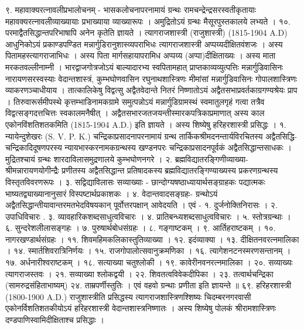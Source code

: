 ९. महावाक्यरत्नावलीप्रभालोचनम् -
भासकलोचनापरनामायं ग्रन्थः रामचन्द्रेन्द्रसरस्वतीकृतायाः महावक्यरत्नावलीव्याख्यायाः प्रभाख्याया व्याख्यारूपः । अमुद्रितोऽयं ग्रन्थः मैसूरपुस्तकालये लभ्यते ।
१०. परमाद्वैतसिद्धान्तपरिभाषापि अनेन कृतेति ज्ञायते ।
त्यागराजशास्त्री (राजुशास्त्री) (1815-1904 A.D)
आधुनिकोऽयं प्रकाण्डपण्डित मन्नार्गुडिरानुशास्व्यपराभिधः त्यागराजशास्त्री अप्पय्यदीक्षितवंशजः । अस्य पितामहस्त्यागराजाभिधः । अस्य पिता मार्गसहायापरामिध अप्पय्य (अप्पा)दीक्षिताख्यः । अस्य माता मरकतवल्लीनाम्नी । भारद्वाजगोत्रजोऽयं बाल्यादारभ्य स्वपितामहात् प्राप्तकाव्यव्युत्पत्तिः मन्नार्गुडिवासिनः नारायणसरस्वस्याः वेदान्तशास्त्रं, कुम्भघोणवासिन रघुनाथशास्त्रिणः मीमांसां मन्नार्गुडिवासिनः गोपालशास्त्रिणः व्याकरणञ्चाधीयाय । तात्कालिकेषु विद्वत्सु अद्वैतवेदान्ते नितरं निष्णातोऽयं अद्वैतसभाप्रवर्तकाग्रगण्यश्रेयः प्राप । तिरुवारूर्समीपस्थे कृत्तम्भाडिनामकग्रामे समुत्पन्नोऽयं मन्नार्गुडिग्रामस्थं स्वमातुलगृहं गत्वा तत्रैव विद्वत्सङ्गदत्तचित्तः स्वकालमनैषीत् । अद्वैतसभारजतजयन्तीस्मारकपत्रिकाप्रमाणात् अस्य काल एकोनविंशतिशतकमिति (1815-1904 A.D.) इति ज्ञायते । अस्य शिष्येषु हरिहरशास्त्री प्रसिद्धः ।
१. न्यायेन्दुशेखरः (S. V. P. K.)
चन्द्रिकाप्रसादनापरनामायं ग्रन्थ तार्किकश्रीमदनन्तार्यविरचितस्य अद्वैतसिद्धि-चन्द्रिकादिदूषणपरस्य न्यायभास्करनामकग्रन्थस्य खण्डनपरः चन्द्रिकाप्रसादनपूर्वकं अद्वैतसिद्धान्तसाधकः । मुद्रितश्चायं ग्रन्थः शारदाविलासमुद्रणालये कुम्भघोणनगरे ।
२. ब्रह्मविद्यातरङ्गिणीव्याख्या-श्रीमन्नारायणयोगीन्द्रैः प्रणीतस्य अद्वैतसिद्धान्त प्रतिषादकस्य ब्रह्मविद्यातरङ्गिण्याख्यस्य प्रकरणग्रन्थस्य विस्तृतविवरणरूपः ।
३. सद्विद्याविलासः सव्याख्याः - छान्दोग्यषष्ठाध्यायार्थसङ्ग्राहकः पद्यात्मकः भाष्यतद्व्याख्यानानुसारं विस्पष्टार्थप्रकाशकः ।
४. वेदान्तवादसङ्ग्रहः- ग्रन्थोऽयं अद्वैतसिद्धान्तीयावान्तरमतभेदविषयकान् पूर्वोत्तरपक्षान् आवेदयति ।
एवं - १. दुर्जनोक्तिनिरासः । २. उपाधिविचारः . ३. व्यावहारिकशब्दसाधुत्वविचारः । ४. प्रातिबन्ध्यशब्दसाधुत्वविचारः । ५. स्तोत्रग्रन्थाः । ६. सुन्दरेशलीलासङ्गहः । ७. पुरुषार्थबोधसंग्रहः । ८. गङ्गाष्टकम् । ९. आर्तिहराष्टकम् । १०. नागरखण्डार्थसंग्रहः । ११. शिवमहिमकलिकास्तुतिव्याख्या । १२. इदंव्याक्या । १३. दीक्षितनवरत्नमालिका । १४. स्मार्तशिवरात्रिनिर्णयः । १५. राजगोपालोत्सवानुक्रमणिका । १६. त्यागेशनटनस्मरणसन्तानम् । १७. अर्धनारीश्वराष्टकम् । १८. सत्याख्या चतुश्लोकी । १९. कावेरीनवनरत्नमालिका । २०. सव्याख्यः त्यागराजस्तवः । २१. सव्याख्या श्लोकद्वयी । २२. शिवतत्वविवेकदीपिका । २३. तत्वार्थचन्द्रिका (सामरुद्रसंहिताभाष्यम्) २४. ताम्रपर्णीस्तुतिः । एवं वहवो ग्रन्थाः प्रणीता इति ज्ञायन्ते ॥
६९. हरिहरशास्त्री (1800-1900 A.D.)
राजुशास्त्रीति प्रसिद्धस्य त्यागराजशास्त्रिणश्शिष्यः चिदम्बरनगरवासी एकोनर्विशतिशतकीयोऽयं हरिहरशास्त्री वेदान्तशास्त्रनिष्णातः । अस्य शिष्येषु पोलकं श्रीरामशास्त्रिणः दण्डपाणिस्वामिदीक्षिताश्च प्रसिद्धाः ।
